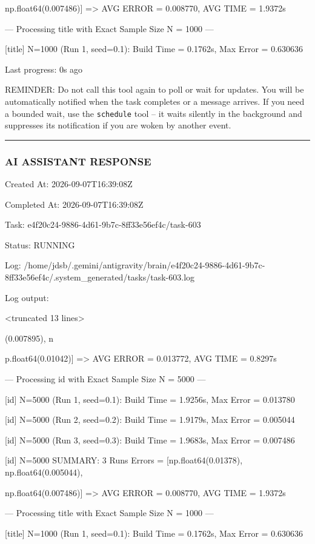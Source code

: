 \documentclass[11pt,a4paper]{article}
\begin{document}
np.float64(0.007486)] => AVG ERROR = 0.008770, AVG TIME = 1.9372s


--- Processing title with Exact Sample Size N = 1000 ---

[title] N=1000 (Run 1, seed=0.1): Build Time = 0.1762s, Max Error = 0.630636


Last progress: 0s ago



REMINDER: Do not call this tool again to poll or wait for updates. You will be automatically notified when the task completes or a message arrives. If you need a bounded wait, use the \texttt{schedule} tool -- it waits silently in the background and suppresses its notification if you are woken by another event.


\hrule

\subsubsection{AI ASSISTANT RESPONSE}

Created At: 2026-09-07T16:39:08Z

Completed At: 2026-09-07T16:39:08Z

Task: e4f20c24-9886-4d61-9b7c-8ff33e56ef4c/task-603

Status: RUNNING

Log: /home/jdsb/.gemini/antigravity/brain/e4f20c24-9886-4d61-9b7c-8ff33e56ef4c/.system\_generated/tasks/task-603.log

Log output:

<truncated 13 lines>

(0.007895), n

p.float64(0.01042)] => AVG ERROR = 0.013772, AVG TIME = 0.8297s

--- Processing id with Exact Sample Size N = 5000 ---

[id] N=5000 (Run 1, seed=0.1): Build Time = 1.9256s, Max Error = 0.013780

[id] N=5000 (Run 2, seed=0.2): Build Time = 1.9179s, Max Error = 0.005044

[id] N=5000 (Run 3, seed=0.3): Build Time = 1.9683s, Max Error = 0.007486

[id] N=5000 SUMMARY: 3 Runs Errors = [np.float64(0.01378), np.float64(0.005044),

np.float64(0.007486)] => AVG ERROR = 0.008770, AVG TIME = 1.9372s


--- Processing title with Exact Sample Size N = 1000 ---

[title] N=1000 (Run 1, seed=0.1): Build Time = 0.1762s, Max Error = 0.630636
\end{document}
